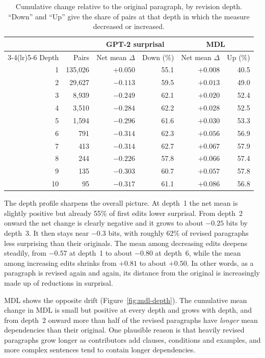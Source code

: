 \documentclass[12pt,a4paper,oneside]{report}
\begin{document}
\begin{table}[ht]
\centering
\small
\caption[Cumulative change by revision depth (paragraph level)]{Cumulative change relative to the original paragraph, by revision depth. ``Down'' and ``Up'' give the share of pairs at that depth in which the measure decreased or increased.}
\label{tab:depth-para}
\begin{tabular}{@{}rrrrrr@{}}
\toprule
 & & \multicolumn{2}{c}{GPT-2 surprisal} & \multicolumn{2}{c}{MDL}\\
\cmidrule(lr){3-4}\cmidrule(lr){5-6}
Depth & Pairs & Net mean $\Delta$ & Down (\%) & Net mean $\Delta$ & Up (\%)\\
\midrule
1 & 135{,}026 & $+0.050$ & 55.1 & $+0.008$ & 40.5\\
2 & 29{,}627 & $-0.113$ & 59.5 & $+0.013$ & 49.0\\
3 & 8{,}939 & $-0.249$ & 62.1 & $+0.020$ & 52.4\\
4 & 3{,}510 & $-0.284$ & 62.2 & $+0.028$ & 52.5\\
5 & 1{,}594 & $-0.296$ & 61.6 & $+0.030$ & 53.3\\
6 & 791 & $-0.314$ & 62.3 & $+0.056$ & 56.9\\
7 & 413 & $-0.314$ & 62.7 & $+0.067$ & 57.9\\
8 & 244 & $-0.226$ & 57.8 & $+0.066$ & 57.4\\
9 & 135 & $-0.303$ & 60.7 & $+0.057$ & 57.8\\
10 & 95 & $-0.317$ & 61.1 & $+0.086$ & 56.8\\
\bottomrule
\end{tabular}
\end{table}

The depth profile sharpens the overall picture. At depth~1 the net mean is slightly positive but already 55\% of first edits lower surprisal. From depth~2 onward the net change is clearly negative and it grows to about $-0.25$ bits by depth~3. It then stays near $-0.3$ bits, with roughly 62\% of revised paragraphs less surprising than their originals. The mean among decreasing edits deepens steadily, from $-0.57$ at depth~1 to about $-0.80$ at depth~6, while the mean among increasing edits shrinks from $+0.81$ to about $+0.50$. In other words, as a paragraph is revised again and again, its distance from the original is increasingly made up of reductions in surprisal.

MDL shows the opposite drift (Figure~\ref{fig:mdl-depth}). The cumulative mean change in MDL is small but positive at every depth and grows with depth, and from depth~2 onward more than half of the revised paragraphs have \emph{longer} mean dependencies than their original. One plausible reason is that heavily revised paragraphs grow longer as contributors add clauses, conditions and examples, and more complex sentences tend to contain longer dependencies.
\end{document}
